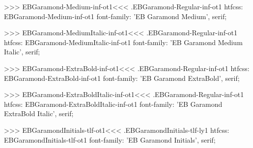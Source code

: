 {{>>>
\<EBGaramond-Medium-inf-ot1\><<<
.EBGaramond-Regular-inf-ot1
htfcss:  EBGaramond-Medium-inf-ot1  font-family: 'EB Garamond Medium', serif;

>>>
\<EBGaramond-MediumItalic-inf-ot1\><<<
.EBGaramond-Regular-inf-ot1
htfcss:  EBGaramond-MediumItalic-inf-ot1  font-family: 'EB Garamond Medium Italic', serif;

>>>
\<EBGaramond-ExtraBold-inf-ot1\><<<
.EBGaramond-Regular-inf-ot1
htfcss:  EBGaramond-ExtraBold-inf-ot1  font-family: 'EB Garamond ExtraBold', serif;

>>>
\<EBGaramond-ExtraBoldItalic-inf-ot1\><<<
.EBGaramond-Regular-inf-ot1
htfcss:  EBGaramond-ExtraBoldItalic-inf-ot1  font-family: 'EB Garamond ExtraBold Italic', serif;

>>>
\<EBGaramondInitials-tlf-ot1\><<<
.EBGaramondInitials-tlf-ly1
htfcss:  EBGaramondInitials-tlf-ot1  font-family: 'EB Garamond Initials', serif;

}}
